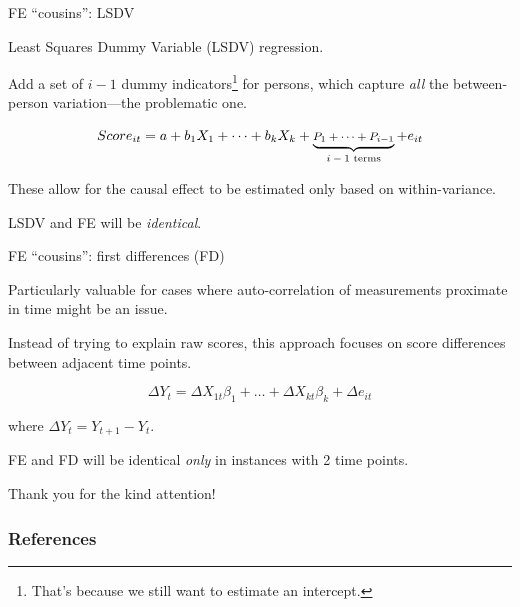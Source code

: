 \documentclass[12pt,english,pdf,xcolor=dvipsnames,aspectratio=169,handout]{beamer}\usepackage[]{graphicx}\usepackage[]{xcolor}
\begin{document}
\begin{frame}{FE ``cousins'': LSDV}

Least Squares Dummy Variable (LSDV) regression.\bigskip

Add a set of $i-1$ dummy indicators\footnote{That's because we still want to estimate an intercept.} for persons, which capture \textit{all} the between-person variation---the problematic one.

\begin{equation}
\footnotesize
Score_{it} = a + b_1X_1 + \dots + b_kX_k + \underbrace{P_1 + \dots + P_{i-1}}_{\text{$i-1$ terms}} + e_{it}
\end{equation}

These allow for the causal effect to be estimated only based on within-variance.\bigskip

LSDV and FE will be \textit{identical}.

\end{frame}



\begin{frame}{FE ``cousins'': first differences (FD)}

Particularly valuable for cases where auto-correlation of measurements proximate in time might be an issue.\bigskip

Instead of trying to explain raw scores, this approach focuses on score differences between adjacent time points.

\begin{equation}
\Delta Y_t = \Delta X_{1t}\beta_1 + \dots + \Delta X_{kt}\beta_k + \Delta e_{it}
\end{equation}

where $\Delta Y_t = Y_{t+1} - Y_t$.\bigskip

FE and FD will be identical \textit{only} in instances with 2 time points.

\end{frame}




\begin{frame}
\begin{center}
    \Huge Thank \textcolor{title}{you} for the kind attention!
\end{center}
\end{frame}


\begin{frame}
\frametitle{References}


\end{frame}
\end{document}
